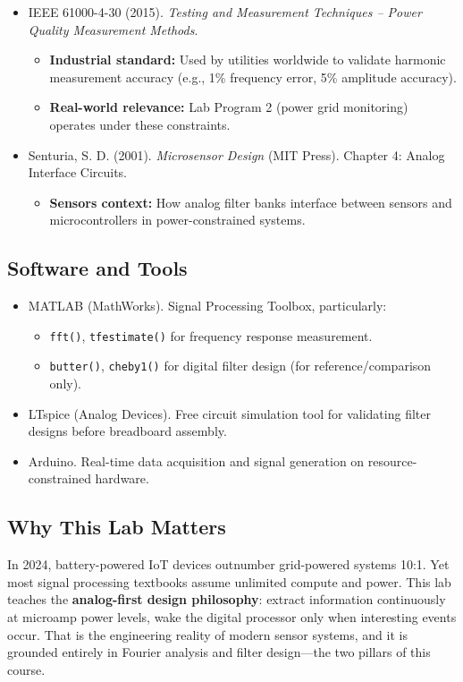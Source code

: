 \documentclass[11pt,letterpaper]{article}
\begin{document}
\begin{itemize}
    \item IEEE 61000-4-30 (2015). \textit{Testing and Measurement Techniques – Power Quality Measurement Methods}.
    \begin{itemize}
        \item \textbf{Industrial standard:} Used by utilities worldwide to validate harmonic measurement accuracy (e.g., 1\% frequency error, 5\% amplitude accuracy).
        \item \textbf{Real-world relevance:} Lab Program 2 (power grid monitoring) operates under these constraints.
    \end{itemize}

    \item Senturia, S. D. (2001). \textit{Microsensor Design} (MIT Press). Chapter 4: Analog Interface Circuits.
    \begin{itemize}
        \item \textbf{Sensors context:} How analog filter banks interface between sensors and microcontrollers in power-constrained systems.
    \end{itemize}
\end{itemize}

\subsection*{Software and Tools}

\begin{itemize}
    \item MATLAB (MathWorks). Signal Processing Toolbox, particularly:
    \begin{itemize}
        \item \texttt{fft()}, \texttt{tfestimate()} for frequency response measurement.
        \item \texttt{butter()}, \texttt{cheby1()} for digital filter design (for reference/comparison only).
    \end{itemize}

    \item LTspice (Analog Devices). Free circuit simulation tool for validating filter designs before breadboard assembly.

    \item Arduino. Real-time data acquisition and signal generation on resource-constrained hardware.
\end{itemize}

\subsection*{Why This Lab Matters}

In 2024, battery-powered IoT devices outnumber grid-powered systems 10:1. Yet most signal processing textbooks assume unlimited compute and power. This lab teaches the \textbf{analog-first design philosophy}: extract information continuously at microamp power levels, wake the digital processor only when interesting events occur. That is the engineering reality of modern sensor systems, and it is grounded entirely in Fourier analysis and filter design—the two pillars of this course.
\end{document}
